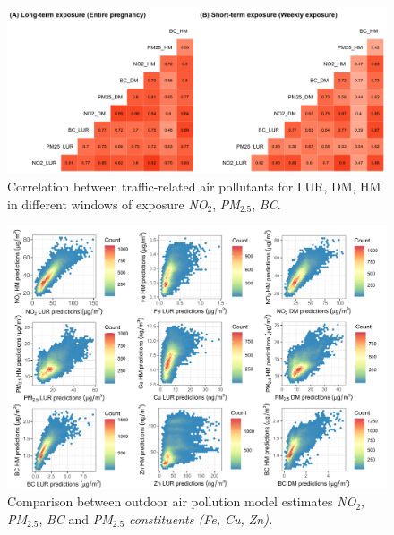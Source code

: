 \documentclass{article}
\begin{document}
\captionsetup[figure]{skip=6pt}
\begin{figure}[!htb]
\includegraphics[width=1.0\textwidth]{figures/correlation_fig.png}
\caption{Correlation between traffic-related air pollutants for LUR, DM, HM in different windows of exposure \textit{NO$_2$}, \textit{PM$_{2.5}$}, \textit{BC}.}
\label{fig5}
\end{figure}



\newpage


\captionsetup[figure]{skip=6pt}
\begin{figure}[!htb]
\includegraphics[width=1.0\textwidth]{figures/final_HEXBIN.png}
\caption{Comparison between outdoor air pollution model estimates \textit{NO$_2$}, \textit{PM$_{2.5}$}, \textit{BC} and \textit{PM$_{2.5}$ constituents (Fe, Cu, Zn).}}
\label{fig6}
\end{figure}
\end{document}
